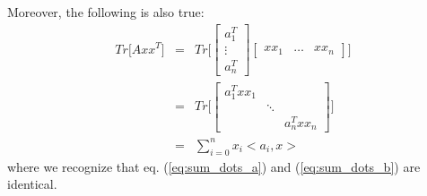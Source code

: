 \documentclass{article}
\begin{document}
Moreover, the following is also true:
\begin{eqnarray}
Tr \bigg [ A x x^T \bigg ] &=& 
Tr \bigg [
\begin{bmatrix} a_1^T \\ \vdots \\ a_n^T \end{bmatrix}
\begin{bmatrix} xx_1 & \hdots & xx_n \end{bmatrix}
\bigg ]  \\
&=&
Tr \bigg [
\begin{bmatrix} 
a_1^T xx_1 & & \\
& \ddots & \\
& & a_n^T xx_n
\end{bmatrix}
\bigg ] \\
&=&
\sum_{i = 0}^n x_i <a_i, x>
\label{eq:sum_dots_b}
\end{eqnarray}
where we recognize that eq. (\ref{eq:sum_dots_a}) and (\ref{eq:sum_dots_b}) are identical.
\end{document}
